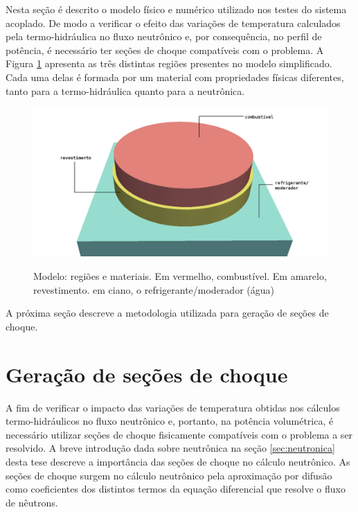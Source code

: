 Nesta seção é descrito o modelo físico e numérico utilizado nos testes do sistema acoplado.
De modo a verificar o efeito das variações de temperatura calculados pela termo-hidráulica
no fluxo neutrônico e, por consequência, no perfil de potência, é necessário ter seções
de choque compatíveis com o problema. A Figura \ref{fig:regions} apresenta as três distintas
regiões presentes no modelo simplificado. Cada uma delas é formada por um material com
propriedades físicas diferentes, tanto para a
termo-hidráulica quanto para a neutrônica.

\begin{figure}[htb]
  \caption{Modelo: regiões e materiais. Em vermelho, combustível. Em amarelo, revestimento.
  em ciano, o refrigerante/moderador (água)}
  \centering\includegraphics[scale=0.5]{figuras/regioes_surface2.png}
  \label{fig:regions}
\end{figure}

A próxima seção descreve a metodologia utilizada para geração de seções de choque. 

\section{Geração de seções de choque}
\label{sec:gerxs}

A fim de verificar o impacto das variações de temperatura obtidas nos cálculos
termo-hidráulicos no fluxo
neutrônico e, portanto, na potência volumétrica, é necessário utilizar seções de choque
fisicamente compatíveis com o problema a ser resolvido. A breve introdução dada sobre
neutrônica na seção \ref{sec:neutronica} desta tese descreve a importância das seções
de choque no cálculo neutrônico. As seções de choque surgem no cálculo neutrônico
pela aproximação por difusão como coeficientes dos distintos termos da equação
diferencial que resolve o fluxo de nêutrons.

